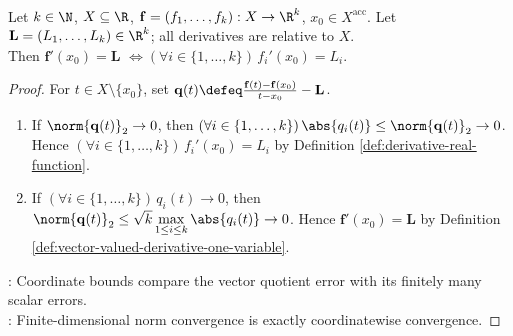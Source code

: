 \begin{proposition} \label{prop:vector-derivative-componentwise} \\
Let $k\in\N$, $X\subseteq\R$, $\mathbf{f}=(f_1,\ldots,f_k):X\to\R^k$, $x_0\in X^{\operatorname{acc}}$. Let $\mathbf{L}=(L_1,\ldots,L_k)\in\R^k$; all derivatives are relative to $X$.\\
Then $\mathbf{f}'(x_0)=\mathbf{L}$ $\Longleftrightarrow(\forall i\in\{1,\ldots,k\})\,f_i'(x_0)=L_i$.
\begin{proof}
For $t\in X\setminus\{x_0\}$, set $\mathbf{q}(t)\defeq\frac{\mathbf{f}(t)-\mathbf{f}(x_0)}{t-x_0}-\mathbf{L}$.
\begin{enumerate}[label=\roman*.]
\setlength{\itemsep}{0pt}
\item[$(\Rightarrow)$] If $\norm{\mathbf{q}(t)}_2\to0$, then $(\forall i\in\{1,\ldots,k\})\,\abs{q_i(t)}\leq\norm{\mathbf{q}(t)}_2\to0$. Hence $(\forall i\in\{1,\ldots,k\})\,f_i'(x_0)=L_i$ by Definition \ref{def:derivative-real-function}.
\item[$(\Leftarrow)$] If $(\forall i\in\{1,\ldots,k\})\,q_i(t)\to0$, then $\norm{\mathbf{q}(t)}_2\leq\sqrt{k}\max\limits_{1\leq i\leq k}\abs{q_i(t)}\to0$. Hence $\mathbf{f}'(x_0)=\mathbf{L}$ by Definition \ref{def:vector-valued-derivative-one-variable}.
\end{enumerate}
: Coordinate bounds compare the vector quotient error with its finitely many scalar errors.\\
: Finite-dimensional norm convergence is exactly coordinatewise convergence.
\end{proof}
\end{proposition}

